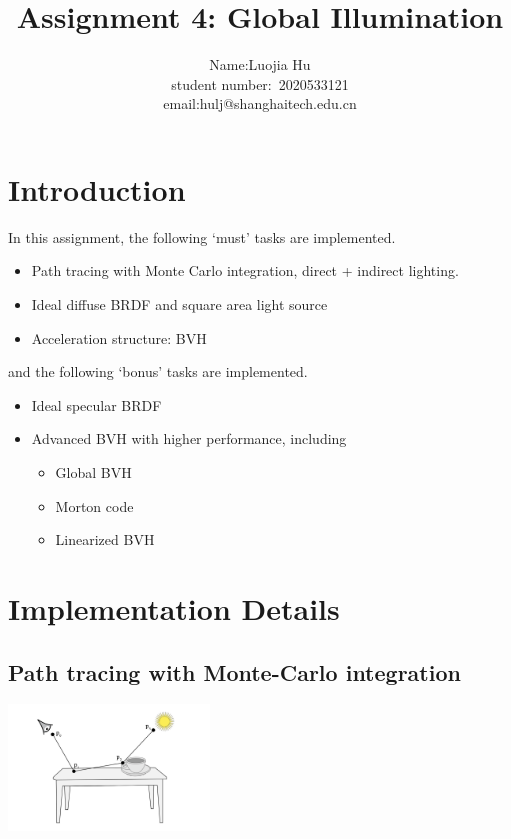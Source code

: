 \documentclass[acmtog]{acmart}
\title{Assignment 4: {Global Illumination}}
\author{Name:\quad Luojia Hu  \\ student number:\ 2020533121
\\email:\quad hulj@shanghaitech.edu.cn}
\begin{document}
\maketitle

\vspace*{2 ex}

\section{Introduction}

In this assignment, the following `must' tasks are implemented.

\begin{itemize}
	\item Path tracing with Monte Carlo integration, direct + indirect lighting.
	\item Ideal diffuse BRDF and square area light source
	\item Acceleration structure: BVH
\end{itemize}

and the following `bonus' tasks are implemented.

\begin{itemize}
	\item Ideal specular BRDF
	\item Advanced BVH with higher performance, including
	\begin{itemize}
		\item Global BVH
		\item Morton code
		\item Linearized BVH
	\end{itemize} 
\end{itemize}

\section{Implementation Details}

\subsection{Path tracing with Monte-Carlo integration}

\begin{center}
	\includegraphics[width=0.4\textwidth]{pictures/path-sampling.jpg}
\end{center}
\end{document}
